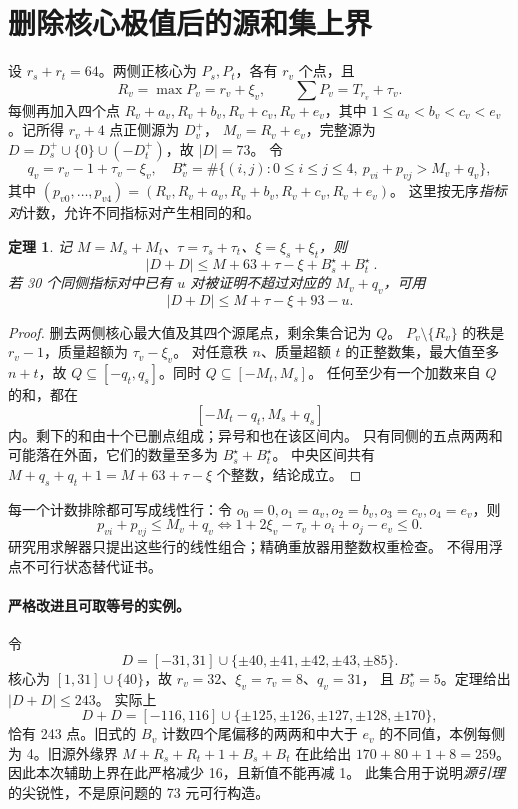 \documentclass[10pt,a4paper]{article}
\newtheorem{theorem}{定理}\newtheorem{lemma}{引理}
\begin{document}
\section{删除核心极值后的源和集上界}
设 $r_s+r_t=64$。两侧正核心为 $P_s,P_t$，各有 $r_v$ 个点，且
\[
 R_v=\max P_v=r_v+\xi_v,\qquad \sum P_v=T_{r_v}+\tau_v.
\]
每侧再加入四个点 $R_v+a_v,R_v+b_v,R_v+c_v,R_v+e_v$，其中
$1\le a_v<b_v<c_v<e_v$。记所得 $r_v+4$ 点正侧源为 $D_v^+$，
$M_v=R_v+e_v$，完整源为 $D=D_s^+\cup\{0\}\cup(-D_t^+)$，故 $|D|=73$。
令
\[
 q_v=r_v-1+\tau_v-\xi_v,\quad
 B_v^\star=\#\{(i,j):0\le i\le j\le4,\ p_{vi}+p_{vj}>M_v+q_v\},
\]
其中 $(p_{v0},\ldots,p_{v4})=(R_v,R_v+a_v,R_v+b_v,R_v+c_v,R_v+e_v)$。
这里按无序\emph{指标对}计数，允许不同指标对产生相同的和。

\begin{theorem}\label{thm:source}
记 $M=M_s+M_t$、$\tau=\tau_s+\tau_t$、$\xi=\xi_s+\xi_t$，则
\[
 \boxed{\ |D+D|\le M+63+\tau-\xi+B_s^\star+B_t^\star\ }.
\]
若 30 个同侧指标对中已有 $u$ 对被证明不超过对应的 $M_v+q_v$，可用
\[
 |D+D|\le M+\tau-\xi+93-u.
\]
\end{theorem}
\begin{proof}
删去两侧核心最大值及其四个源尾点，剩余集合记为 $Q$。
$P_v\setminus\{R_v\}$ 的秩是 $r_v-1$，质量超额为 $\tau_v-\xi_v$。
对任意秩 $n$、质量超额 $t$ 的正整数集，最大值至多 $n+t$，故
$Q\subseteq[-q_t,q_s]$。同时 $Q\subseteq[-M_t,M_s]$。
任何至少有一个加数来自 $Q$ 的和，都在
\[
 [-M_t-q_t,M_s+q_s]
\]
内。剩下的和由十个已删点组成；异号和也在该区间内。
只有同侧的五点两两和可能落在外面，它们的数量至多为 $B_s^\star+B_t^\star$。
中央区间共有 $M+q_s+q_t+1=M+63+\tau-\xi$ 个整数，结论成立。
\end{proof}

每一个计数排除都可写成线性行：令 $o_0=0,o_1=a_v,o_2=b_v,o_3=c_v,o_4=e_v$，则
\[
 p_{vi}+p_{vj}\le M_v+q_v
 \iff 1+2\xi_v-\tau_v+o_i+o_j-e_v\le0.
\]
研究用求解器只提出这些行的线性组合；精确重放器用整数权重检查。
不得用浮点不可行状态替代证书。

\paragraph{严格改进且可取等号的实例。}
令
\[
 D=[-31,31]\cup\{\pm40,\pm41,\pm42,\pm43,\pm85\}.
\]
核心为 $[1,31]\cup\{40\}$，故 $r_v=32$、$\xi_v=\tau_v=8$、$q_v=31$，
且 $B_v^\star=5$。定理给出 $|D+D|\le243$。
实际上
\[
 D+D=[-116,116]\cup\{\pm125,\pm126,\pm127,\pm128,\pm170\},
\]
恰有 243 点。旧式的 $B_v$ 计数四个尾偏移的两两和中大于 $e_v$ 的不同值，本例每侧为 4。旧源外缘界 $M+R_s+R_t+1+B_s+B_t$ 在此给出
$170+80+1+8=259$。因此本次辅助上界在此严格减少 16，且新值不能再减 1。
此集合用于说明\emph{源引理}的尖锐性，不是原问题的 73 元可行构造。
\end{document}
